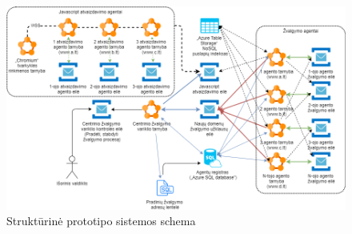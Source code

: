 \begin{figure}[htp!]
\hspace{-1cm}
\centering
\includegraphics[scale=0.5]{img/Azure_Implementacija_Kasparo.png}
\caption{Struktūrinė prototipo sistemos schema}
\label{fig:azure_implementation_structural_scheme}
\end{figure}